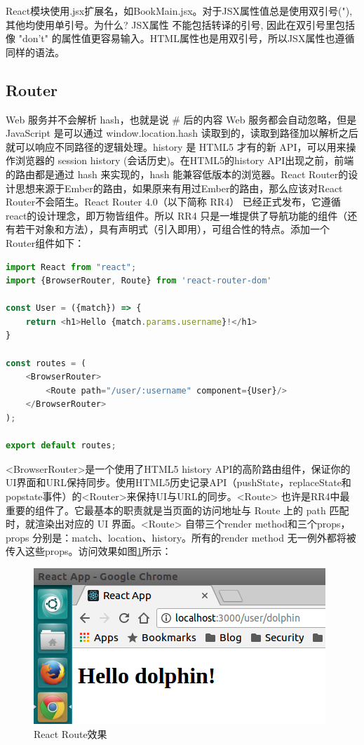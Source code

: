 \documentclass[letter]{book}
\begin{document}
React模块使用.jsx扩展名，如BookMain.jsx。对于JSX属性值总是使用双引号("), 其他均使用单引号。为什么? JSX属性 不能包括转译的引号, 因此在双引号里包括像 "don't" 的属性值更容易输入。HTML属性也是用双引号，所以JSX属性也遵循同样的语法。

\subsection{Router}

Web 服务并不会解析 hash，也就是说 \# 后的内容 Web 服务都会自动忽略，但是 JavaScript 是可以通过 window.location.hash 读取到的，读取到路径加以解析之后就可以响应不同路径的逻辑处理。history 是 HTML5 才有的新 API，可以用来操作浏览器的 session history (会话历史)。在HTML5的history API出现之前，前端的路由都是通过 hash 来实现的，hash 能兼容低版本的浏览器。React Router的设计思想来源于Ember的路由，如果原来有用过Ember的路由，那么应该对React Router不会陌生。React Router 4.0（以下简称 RR4） 已经正式发布，它遵循react的设计理念，即万物皆组件。所以 RR4 只是一堆提供了导航功能的组件（还有若干对象和方法），具有声明式（引入即用），可组合性的特点。添加一个Router组件如下：

\begin{lstlisting}[language=Javascript]
import React from "react";
import {BrowserRouter, Route} from 'react-router-dom'

const User = ({match}) => {
	return <h1>Hello {match.params.username}!</h1>
}

const routes = (
	<BrowserRouter>
		<Route path="/user/:username" component={User}/>
	</BrowserRouter>
);

export default routes;
\end{lstlisting}

<BrowserRouter>是一个使用了HTML5 history API的高阶路由组件，保证你的UI界面和URL保持同步。使用HTML5历史记录API（pushState，replaceState和popstate事件）的<Router>来保持UI与URL的同步。<Route> 也许是RR4中最重要的组件了。它最基本的职责就是当页面的访问地址与 Route 上的 path 匹配时，就渲染出对应的 UI 界面。<Route> 自带三个render method和三个props，props 分别是：match、location、history。所有的render method 无一例外都将被传入这些props。访问效果如图\ref{fig:firstroute}所示：

\begin{figure}[htbp]
	\centering
	\includegraphics[scale=0.6]{firstroute.png}
	\caption{React Route效果}
	\label{fig:firstroute}
\end{figure}
\end{document}
